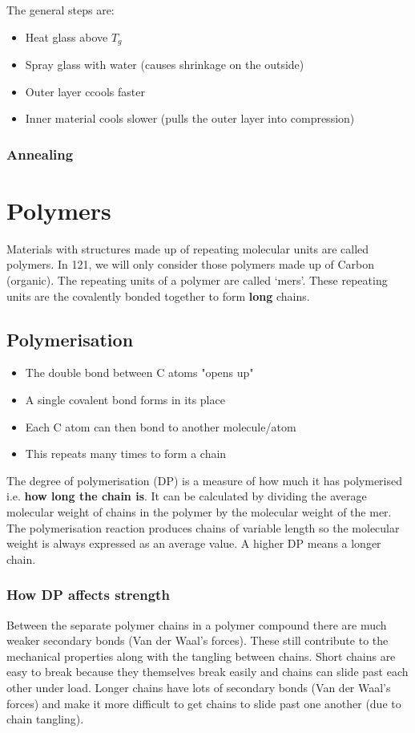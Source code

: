 \documentclass[12pt]{article}
\begin{document}
The general steps are:
\begin{itemize}
  \item Heat glass above $T_g$
  \item Spray glass with water (causes shrinkage on the outside)
  \item Outer layer ccools faster
  \item Inner material cools slower (pulls the outer layer into compression)
\end{itemize}

\subsubsection{Annealing}

\section{Polymers}
Materials with structures made up of repeating molecular units are called polymers.
In 121, we will only consider those polymers made up of Carbon (organic).
The repeating units of a polymer are called `mers'. 
These repeating units are the covalently bonded together to form \textbf{long} chains.

\subsection{Polymerisation}
\begin{itemize}
  \item The double bond between C atoms "opens up"
  \item A single covalent bond forms in its place 
  \item Each C atom can then bond to another molecule/atom
  \item This repeats many times to form a chain
\end{itemize}

The degree of polymerisation (DP) is a measure of how much it has polymerised i.e. \textbf{how long the chain is}.
It can be calculated by dividing the average molecular weight of chains in the polymer by the molecular weight of the mer.
The polymerisation reaction produces chains of variable length so the molecular weight is always expressed as an average value.
A higher DP means a longer chain.

\subsubsection{How DP affects strength}
Between the separate polymer chains in a polymer compound there are much weaker secondary bonds (Van der Waal's forces). 
These still contribute to the mechanical properties along with the tangling between chains.
Short chains are easy to break because they themselves break easily and chains can slide past each other under load.
Longer chains have lots of secondary bonds (Van der Waal's forces) and make it more difficult to get chains to slide past one another (due to chain tangling).
\end{document}
